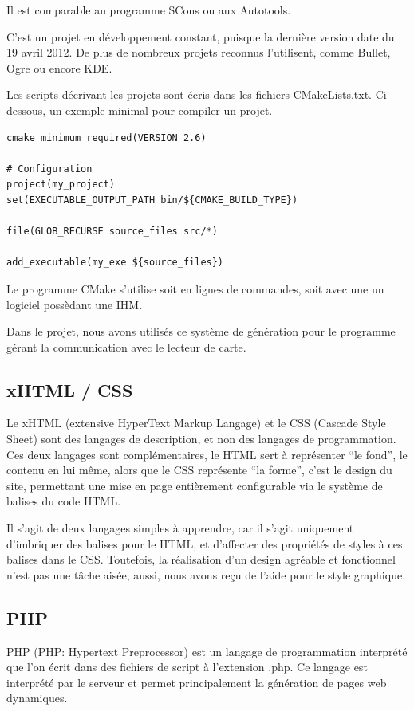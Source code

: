 Il est comparable au programme SCons ou aux Autotools.

C'est un projet en développement constant, puisque la dernière version date du 19
avril 2012. De plus de nombreux projets reconnus l'utilisent, comme Bullet, Ogre
ou encore KDE.

Les scripts décrivant les projets sont écris dans les fichiers CMakeLists.txt.
Ci-dessous, un exemple minimal pour compiler un projet.

    \lstset{language=Bash}
    \begin{lstlisting} 
cmake_minimum_required(VERSION 2.6)
		
# Configuration
project(my_project)
set(EXECUTABLE_OUTPUT_PATH bin/${CMAKE_BUILD_TYPE})

file(GLOB_RECURSE source_files src/*)

add_executable(my_exe ${source_files})
    \end{lstlisting}

Le programme CMake s'utilise soit en lignes de commandes, soit avec une un logiciel
possèdant une IHM.

Dans le projet, nous avons utilisés ce système de génération pour le programme 
gérant la communication avec le lecteur de carte.


        \subsection{xHTML / CSS}
Le xHTML (extensive HyperText Markup Langage) et le CSS (Cascade Style Sheet) sont
des langages de description, et non des langages de programmation.
Ces deux langages sont complémentaires, le HTML sert à représenter ``le fond'', le contenu
en lui même, alors que le CSS représente ``la forme'', c'est le design du site, permettant
une mise en page entièrement configurable via le système de balises du code HTML.

Il s'agit de deux langages simples à apprendre, car il s'agit uniquement d'imbriquer des
balises pour le HTML, et d'affecter des propriétés de styles à ces balises dans le CSS.
Toutefois, la réalisation d'un design agréable et fonctionnel n'est pas une tâche aisée,
aussi, nous avons reçu de l'aide pour le style graphique.


        \subsection{PHP}
PHP \cite{php} (PHP: Hypertext Preprocessor) est un langage de programmation 
interprété que l'on écrit dans des fichiers de script à l'extension .php. Ce 
langage est interprété par le serveur et permet principalement la génération de 
pages web dynamiques.

